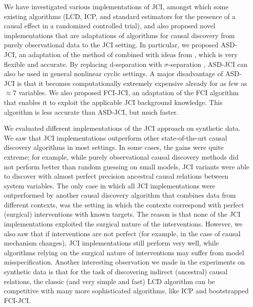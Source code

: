 \documentclass[twoside,11pt]{article}
\begin{document}
 We have investigated various
implementations of JCI, amongst which some existing algorithms (LCD, ICP, and standard estimators for the
presence of a causal effect in a randomized controlled trial), and also proposed novel implementations that
are adaptations of algorithms for causal discovery from purely observational data to the JCI setting. In particular, we
proposed ASD-JCI, an adaptation of the method of \citet{HEJ2014} combined with ideas from \citet{MagliacaneClaassenMooij_NIPS_16}, which is
very flexible and accurate.
By replacing d-separation with $\sigma$-separation \citep{ForreMooij_UAI_18}, ASD-JCI can also be used in 
general nonlinear cyclic settings. A major disadvantage of ASD-JCI is that 
it becomes computationally extremely expensive already for as few as $\approx 7$ variables.
We also proposed FCI-JCI, an adaptation of the FCI algorithm that enables it to 
exploit the applicable JCI background knowledge. This algorithm is less accurate than ASD-JCI, but much faster.

We evaluated different implementations of the JCI approach on synthetic data.
We saw that JCI implementations outperform other state-of-the-art causal
discovery algorithms in most settings. In some cases, the gains were quite extreme;
for example, while purely observational causal discovery methods did not 
perform better than random guessing on small models, JCI variants were able to discover with
almost perfect precision ancestral causal relations between system variables.
The only case in which all JCI implementations
were outperformed by another causal discovery algorithm that combines data from
different contexts, was the setting in which the contexts correspond with 
perfect (surgical) interventions with known targets. The reason is that none of the
JCI implementations exploited the surgical nature of the interventions. 
However, we also saw that if interventions are not perfect (for example, in the case
of causal mechanism changes), JCI implementations still perform very well,
while algorithms relying on the surgical nature of interventions may suffer from model
misspecification.
Another interesting observation we made in the experiments on synthetic data is that for the
task of discovering indirect (ancestral) causal relations, the classic (and very
simple and fast) LCD algorithm can be competitive with many more sophisticated algorithms,
like ICP and bootstrapped FCI-JCI.
\end{document}
